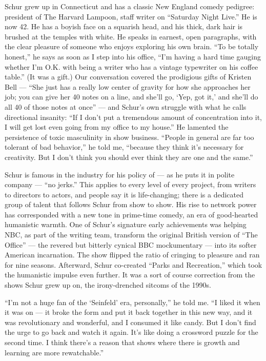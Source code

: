 Schur grew up in Connecticut and has a classic New England comedy
pedigree: president of The Harvard Lampoon, staff writer on ``Saturday
Night Live.'' He is now 42. He has a boyish face on a squarish head, and
his thick, dark hair is brushed at the temples with white. He speaks in
earnest, open paragraphs, with the clear pleasure of someone who enjoys
exploring his own brain. ``To be totally honest,'' he says as soon as I
step into his office, ``I'm having a hard time gauging whether I'm O.K.
with being a writer who has a vintage typewriter on his coffee table.''
(It was a gift.) Our conversation covered the prodigious gifts of
Kristen Bell --- ``She just has a really low center of gravity for how
she approaches her job; you can give her 40 notes on a line, and she'll
go, `Yep, got it,' and she'll do all 40 of those notes at once'' --- and
Schur's own struggle with what he calls directional insanity: ``If I
don't put a tremendous amount of concentration into it, I will get lost
even going from my office to my house.'' He lamented the persistence of
toxic masculinity in show business. ``People in general are far too
tolerant of bad behavior,'' he told me, ``because they think it's
necessary for creativity. But I don't think you should ever think they
are one and the same.''

Schur is famous in the industry for his policy of --- as he puts it in
polite company --- ``no jerks.'' This applies to every level of every
project, from writers to directors to actors, and people say it is
life-changing; there is a dedicated group of talent that follows Schur
from show to show. His rise to network power has corresponded with a new
tone in prime-time comedy, an era of good-hearted humanistic warmth. One
of Schur's signature early achievements was helping NBC, as part of the
writing team, transform the original British version of ``The Office''
--- the revered but bitterly cynical BBC mockumentary --- into its
softer American incarnation. The show flipped the ratio of cringing to
pleasure and ran for nine seasons. Afterward, Schur co-created ``Parks
and Recreation,'' which took the humanistic impulse even further. It was
a sort of course correction from the shows Schur grew up on, the
irony-drenched sitcoms of the 1990s.

``I'm not a huge fan of the `Seinfeld' era, personally,'' he told me.
``I liked it when it was on --- it broke the form and put it back
together in this new way, and it was revolutionary and wonderful, and I
consumed it like candy. But I don't find the urge to go back and watch
it again. It's like doing a crossword puzzle for the second time. I
think there's a reason that shows where there is growth and learning are
more rewatchable.''

